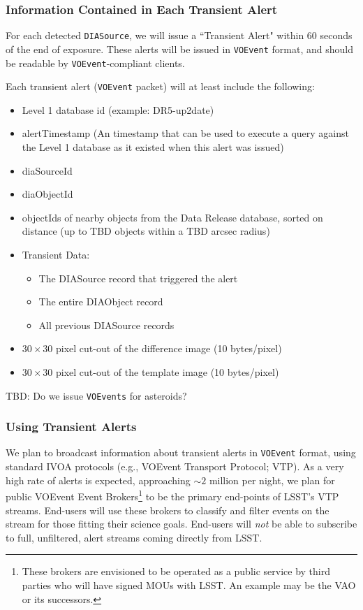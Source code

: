 \documentclass[12pt]{article}
\newcommand{\code}[1]{\texttt{#1}}
\newcommand{\DIASource}{\code{DIASource}\xspace}
\newcommand{\DB}{{Level 1 database}\xspace}
\newcommand{\DR}{{Data Release database}\xspace}
\newcommand{\VOEvent}{\code{VOEvent}\xspace}
\newcommand{\VOEvents}{\code{VOEvents}\xspace}
\begin{document}
\subsubsection{Information Contained in Each Transient Alert}

For each detected \DIASource, we will issue a ``Transient Alert" within 60 seconds of the end of exposure. These alerts will be issued in \VOEvent format, and should be readable by \VOEvent-compliant clients.

Each transient alert (\VOEvent packet) will at least include the following:

\begin{itemize}
\item \DB id (example: DR5-up2date)
\item alertTimestamp (An timestamp that can be used to execute a query against the \DB as it existed when this alert was issued)
\item diaSourceId
\item diaObjectId
\item objectIds of nearby objects from the \DR, sorted on distance (up to TBD objects within a TBD arcsec radius)
\item Transient Data:
    \begin{itemize}
    \item The DIASource record that triggered the alert
    \item The entire DIAObject record
    \item All previous DIASource records
    \end{itemize}
\item $30\times 30$ pixel cut-out of the difference image (10 bytes/pixel)
\item $30\times 30$ pixel cut-out of the template image (10 bytes/pixel)
\end{itemize}

TBD: Do we issue \VOEvents for asteroids?

\subsubsection{Using Transient Alerts}

We plan to broadcast information about transient alerts in \VOEvent format, using standard IVOA protocols (e.g., VOEvent Transport Protocol; VTP). As a very high rate of alerts is expected, approaching $\sim 2$ million per night, we plan for public VOEvent Event Brokers\footnote{These brokers are envisioned to be operated as a public service by third parties who will have signed MOUs with LSST. An example may be the VAO or its successors.} to be the primary end-points of LSST's VTP streams. End-users will use these brokers to classify and filter events on the stream for those fitting their science goals. End-users will {\em not} be able to subscribe to full, unfiltered, alert streams coming directly from LSST.
\end{document}
